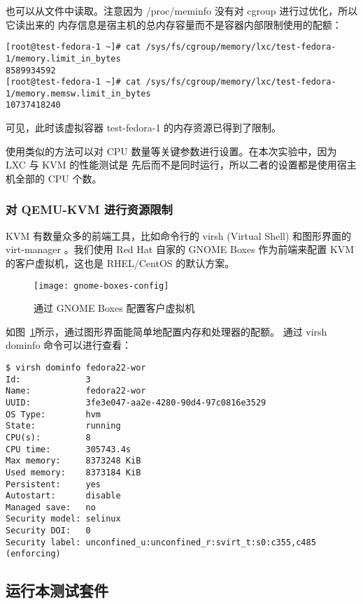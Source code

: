 也可以从文件中读取。注意因为 /proc/meminfo 没有对 cgroup 进行过优化，所以它读出来的
内存信息是宿主机的总内存容量而不是容器内部限制使用的配额：

\begin{lstlisting}
[root@test-fedora-1 ~]# cat /sys/fs/cgroup/memory/lxc/test-fedora-1/memory.limit_in_bytes
8589934592
[root@test-fedora-1 ~]# cat /sys/fs/cgroup/memory/lxc/test-fedora-1/memory.memsw.limit_in_bytes
10737418240
\end{lstlisting}

可见，此时该虚拟容器 test-fedora-1 的内存资源已得到了限制。

使用类似的方法可以对 CPU 数量等关键参数进行设置。在本次实验中，因为 LXC 与 KVM 的性能测试是
先后而不是同时运行，所以二者的设置都是使用宿主机全部的 CPU 个数。

\subsubsection{对 QEMU-KVM 进行资源限制}

KVM 有数量众多的前端工具，比如命令行的 virsh (Virtual Shell) 和图形界面的 virt-manager
。我们使用 Red Hat 自家的 GNOME Boxes 作为前端来配置 KVM 的客户虚拟机，这也是 RHEL/CentOS
的默认方案。

\begin{figure}[t]
    \centering
    \texttt{[image: gnome-boxes-config]}
    \caption{通过 GNOME Boxes 配置客户虚拟机}
    \label{fig:gnome-boxes-config}
\end{figure}

如图~\ref{fig:gnome-boxes-config}所示，通过图形界面能简单地配置内存和处理器的配额。
通过 virsh dominfo 命令可以进行查看：

\begin{lstlisting}
$ virsh dominfo fedora22-wor
Id:             3
Name:           fedora22-wor
UUID:           3fe3e047-aa2e-4280-90d4-97c0816e3529
OS Type:        hvm
State:          running
CPU(s):         8
CPU time:       305743.4s
Max memory:     8373248 KiB
Used memory:    8373184 KiB
Persistent:     yes
Autostart:      disable
Managed save:   no
Security model: selinux
Security DOI:   0
Security label: unconfined_u:unconfined_r:svirt_t:s0:c355,c485 (enforcing)
\end{lstlisting}

\subsection{运行本测试套件}

